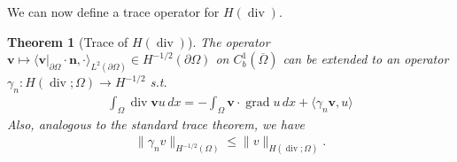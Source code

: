 \documentclass[12pt,a4paper]{article}
\numberwithin{equation}{subsection}
\numberwithin{lemma}{subsection}
\newtheorem{theorem}[lemma]{Theorem}
\theoremstyle{definition}
\DeclareMathOperator{\diver}{div}
\DeclareMathOperator{\grad}{grad}
\begin{document}
We can now define a trace operator for $H(\diver)$.
\begin{theorem}[Trace of $H(\diver)$]\label{thm:trace_of_hdiv}
    The operator $\mathbf{v} \mapsto \langle \mathbf{v}|_{\partial \Omega} \cdot \mathbf{n}, \cdot
    \rangle_{L^2(\partial \Omega)} \in H^{-1/2}(\partial\Omega)$
    on $C^1_b(\overline{\Omega})$ can be extended to an operator 
    $\gamma_n: H(\diver;\Omega) \rightarrow H^{-1/2}$ s.t.
    \begin{align*}
        \int_\Omega \diver \mathbf{v} u \, dx 
        = -\int_\Omega \mathbf{v} \cdot \grad u \, dx + \langle \gamma_n \mathbf{v}, u \rangle
    \end{align*}
    Also, analogous to the standard trace theorem, we have
    \begin{align*}
        \lVert \gamma_n v \rVert _{H^{-1/2}(\Omega)} 
        \leq     \lVert v \rVert _{H(\diver; \Omega)}.
    \end{align*}
\end{theorem}
\end{document}
